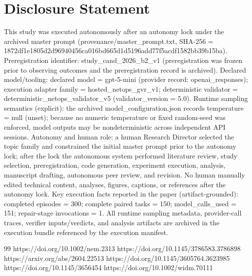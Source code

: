 \documentclass[conference]{IEEEtran}
\begin{document}
\section*{Disclosure Statement}
This study was executed autonomously after an autonomy lock under the archived master prompt (provenance/master\_prompt.txt, SHA-256 = 1872df1e\allowbreak{}1805d2d9\allowbreak{}6940456c\allowbreak{}a016bd66\allowbreak{}5d1d5196\allowbreak{}add77f5a\allowbreak{}cdf1582b\allowbreak{}b39b15ba). Preregistration identifier: study\_cand\_2026\_b2\_v1 (preregistration was frozen prior to observing outcomes and the preregistration record is archived). Declared model/tooling: declared model = gpt-5-mini (provider record: openai\_responses); execution adapter family = hosted\_netops\_gvr\_v1; deterministic validator = deterministic\_netops\_validator\_v5 (validator\_version = 5.0). Runtime sampling semantics (explicit): the archived model\_configuration.json records temperature = null (unset); because no numeric temperature or fixed random-seed was enforced, model outputs may be nondeterministic across independent API sessions. Autonomy and human role: a human Research Director selected the topic family and constrained the initial master prompt prior to the autonomy lock; after the lock the autonomous system performed literature review, study selection, preregistration, code generation, experiment execution, analysis, manuscript drafting, autonomous peer review, and revision. No human manually edited technical content, analyses, figures, captions, or references after the autonomy lock. Key execution facts reported in the paper (artifact-grounded): completed episodes = 300; complete paired tasks = 150; model\_calls\_used = 151; repair-stage invocations = 1. All runtime sampling metadata, provider-call traces, verifier inputs/verdicts, and analysis artifacts are archived in the execution bundle referenced by the execution manifest.

\begin{thebibliography}{99}
 https://doi.org/10.1002/nem.2313
 https://doi.org/10.1145/3786583.3786898
 https://arxiv.org/abs/2604.22513
 https://doi.org/10.1145/3605764.3623985
 https://doi.org/10.1145/3656454
 https://doi.org/10.1002/widm.70111
\end{thebibliography}
\end{document}
